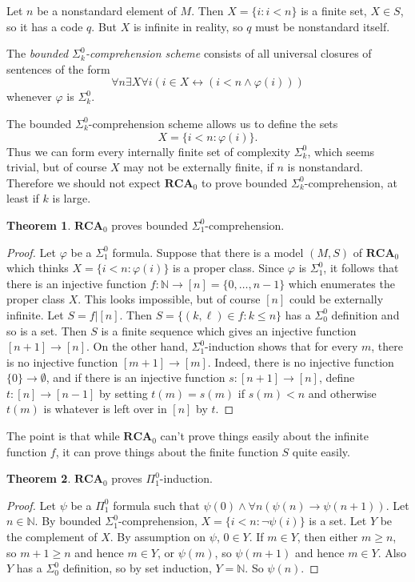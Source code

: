 \documentclass[12pt]{book}
\newcommand{\NN}{\mathbb{N}}
\newcommand{\RCA}{\mathbf{RCA}}
\newcommand{\dfn}[1]{\emph{#1}\index{#1}}
\theoremstyle{definition}
\newtheorem{theorem}{Theorem}[chapter]
\newenvironment{definition}
  {\pushQED{\qed}\renewcommand{\qedsymbol}{$\diamondsuit$}\definitionx}
  {\popQED\endexamplex}
\begin{document}
Let $n$ be a nonstandard element of $M$.
Then $X = \{i: i < n\}$ is a finite set, $X \in S$, so it has a code $q$.
But $X$ is infinite in reality, so $q$ must be nonstandard itself.

\begin{definition}
The \dfn{bounded $\Sigma_k^0$-comprehension scheme} consists of all universal closures of sentences of the form
$$\forall n \exists X \forall i(i \in X \leftrightarrow (i < n \wedge \varphi(i)))$$
whenever $\varphi$ is $\Sigma_k^0$.
\end{definition}

The bounded $\Sigma_k^0$-comprehension scheme allows us to define the sets
$$X = \{i < n: \varphi(i)\}.$$
Thus we can form every internally finite set of complexity $\Sigma_k^0$, which seems trivial, but of course $X$ may not be externally finite, if $n$ is nonstandard.
Therefore we should not expect $\RCA_0$ to prove bounded $\Sigma_k^0$-comprehension, at least if $k$ is large.

\begin{theorem}
$\RCA_0$ proves bounded $\Sigma_1^0$-comprehension.
\end{theorem}
\begin{proof}
Let $\varphi$ be a $\Sigma_1^0$ formula.
Suppose that there is a model $(M, S)$ of $\RCA_0$ which thinks $X = \{i < n: \varphi(i)\}$ is a proper class.
Since $\varphi$ is $\Sigma_1^0$, it follows that there is an injective function $f: \NN \to [n] = \{0, \dots, n - 1\}$ which enumerates the proper class $X$.
This looks impossible, but of course $[n]$ could be externally infinite.
Let $S = f|[n]$. Then $S = \{(k, \ell) \in f: k \leq n\}$ has a $\Sigma_0^0$ definition and so is a set.
Then $S$ is a finite sequence which gives an injective function $[n + 1] \to [n]$.
On the other hand, $\Sigma_1^0$-induction shows that for every $m$, there is no injective function $[m + 1] \to [m]$.
Indeed, there is no injective function $\{0\} \to \emptyset$, and if there is an injective function $s: [n + 1] \to [n]$, define $t: [n] \to [n - 1]$ by setting $t(m) = s(m)$ if $s(m) < n$ and otherwise $t(m)$ is whatever is left over in $[n]$ by $t$.
\end{proof}

The point is that while $\RCA_0$ can't prove things easily about the infinite function $f$, it can prove things about the finite function $S$ quite easily.

\begin{theorem}
$\RCA_0$ proves $\Pi_1^0$-induction.
\end{theorem}
\begin{proof}
Let $\psi$ be a $\Pi_1^0$ formula such that $\psi(0) \wedge \forall n(\psi(n) \to \psi(n+1))$.
Let $n \in \NN$.
By bounded $\Sigma_1^0$-comprehension, $X = \{i < n: \neg\psi(i)\}$ is a set.
Let $Y$ be the complement of $X$.
By assumption on $\psi$, $0 \in Y$.
If $m \in Y$, then either $m \geq n$, so $m + 1 \geq n$ and hence $m \in Y$, or $\psi(m)$, so $\psi(m+1)$ and hence $m \in Y$.
Also $Y$ has a $\Sigma_0^0$ definition, so by set induction, $Y = \NN$.
So $\psi(n)$.
\end{proof}
\end{document}
